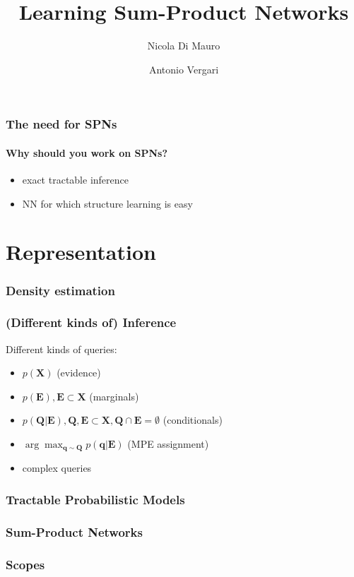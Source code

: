 \documentclass[xcolor={usenames,dvipsnames,svgnames}, compress]{beamer}
\title{Learning Sum-Product Networks}
\author{Nicola Di Mauro \and Antonio Vergari}
\institute{Università degli Studi di Bari}
\begin{document}
\begin{frame}
  \titlepage
\end{frame}


\begin{frame}[t]
  \frametitle{The need for SPNs}
  \framesubtitle{Why should you work on SPNs?}
\begin{itemize}
\item exact tractable inference
  \item NN for which structure learning is easy
\end{itemize}
\end{frame}

\section{Representation}
{
  \begin{frame}
    \sectionpage
  \end{frame}
}

\begin{frame}
  \frametitle{Density estimation}
\end{frame}

\begin{frame}
  \frametitle{(Different kinds of) Inference}
  Different kinds of queries:
  \begin{itemize}
  \item $p(\mathbf{X})$ (evidence)
  \item $p(\mathbf{E}), \mathbf{E}\subset\mathbf{X}$ (marginals)
  \item $p(\mathbf{Q}|\mathbf{E}), \mathbf{Q},
    \mathbf{E}\subset\mathbf{X}, \mathbf{Q}\cap \mathbf{E}=\emptyset$ (conditionals)
  \item
    $\arg\max_{\mathbf{q}\sim\mathbf{Q}}p(\mathbf{q}|\mathbf{E})$
    (MPE assignment)
    \item complex queries
  \end{itemize}
\end{frame}

\begin{frame}
  \frametitle{Tractable Probabilistic Models}
\end{frame}

\begin{frame}
  \frametitle{Sum-Product Networks}
\end{frame}

\begin{frame}
  \frametitle{Scopes}
\end{frame}
\end{document}
